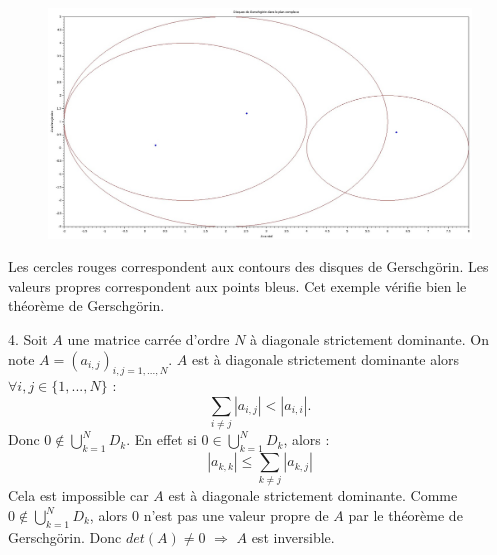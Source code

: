 \documentclass[a4paper,11pt]{article}
\begin{document}
\begin{figure}[H]
	\centering
	\includegraphics[width=420pt]{graphes/exercice7.jpg}	
\end{figure}

Les cercles rouges correspondent aux contours des disques de Gerschgörin. Les valeurs propres correspondent aux points bleus. Cet exemple vérifie bien le théorème de Gerschgörin.

	4. Soit $A$ une matrice carrée d'ordre $N$ à diagonale strictement dominante. On note $A = (a_{i,j})_{i,j=1,...,N}$.
	$A$ est à diagonale strictement dominante alors $\forall i, j \in \{1, ..., N\}$ :
	\begin{equation*}
		\sum\limits_{i \neq j} |a_{i, j}| < |a_{i, i}|.
	\end{equation*}
	Donc $0 \notin \bigcup\limits_{k=1}^{N} D_{k}$. En effet si $0 \in \bigcup\limits_{k=1}^{N} D_{k}$, alors :
	\begin{equation*}
		|a_{k, k}| \leqslant \sum\limits_{k \neq j} |a_{k, j}|
	\end{equation*}
	Cela est impossible car $A$ est à diagonale strictement dominante.
	Comme $0 \notin \bigcup\limits_{k=1}^{N} D_{k}$, alors $0$ n'est pas une valeur propre de $A$ par le théorème de Gerschgörin.
	Donc $det(A) \neq 0$ $\Longrightarrow$ $A$ est inversible.
\end{document}
